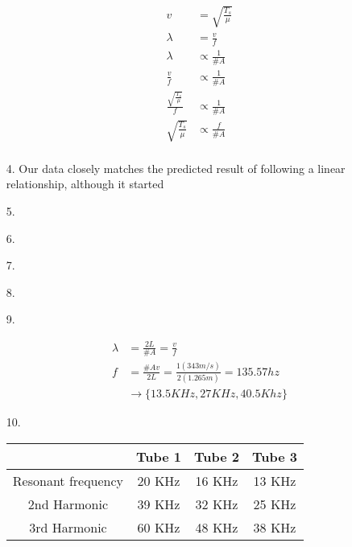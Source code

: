 \documentclass[10pt, letterpaper]{article}
\begin{document}
\begin{itemize}
        \begin{align*}
            v       
                & = \sqrt{\frac{T_{s}}{\mu}}        \\
            \lambda 
                & = \frac{v}{f}                     \\
            \lambda 
                & \propto \frac{1}{\#A}             \\
            \frac{v}{f} 
                & \propto \frac{1}{\#A}             \\
            \frac{\sqrt{\frac{T_{s}}{\mu}}}{f}
                & \propto \frac{1}{\#A}             \\
            \sqrt{\frac{T_{s}}{\mu}}
                & \propto \frac{f}{\#A}             \\
        \end{align*}

        \item [4.] Our data closely matches the predicted result of following a linear relationship, although it started 
        \item [5.]\mbox{}
        
        \item [6.]
        \item [7.]
        \item [8.]
        \item [9.]
        
        \begin{align*}
            \lambda & = \frac{2L}{\#A} = \frac{v}{f}    \\
            f   & = \frac{\#Av}{2L} 
                = \frac{1(343m/s)}{2(1.265m)} 
                = 135.57 hz                             \\
                & \rightarrow \{13.5KHz, 27KHz, 40.5Khz\}
        \end{align*}

        \item [10.]\mbox{}
        
        \begin{center}
            \begin{tabular}{|c|c|c|c|}
                \hline
                & Tube 1 & Tube 2 & Tube 3  \\
                \hline
                Resonant frequency & 20 KHz & 16 KHz & 13 KHz \\
                \hline
                2nd Harmonic & 39 KHz & 32 KHz & 25 KHz \\
                \hline
                3rd Harmonic & 60 KHz & 48 KHz & 38 KHz \\
                \hline
            \end{tabular}
        \end{center}
        

\end{itemize}
\end{document}
